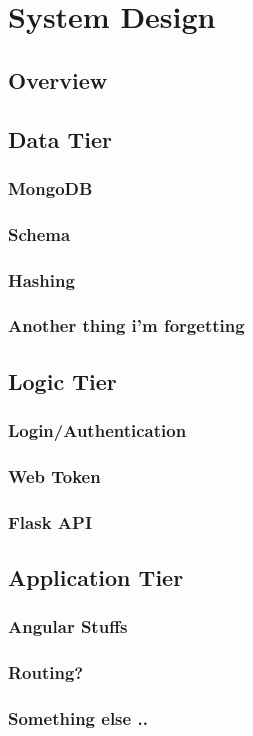 \chapter{System Design}

\section{Overview}

\section{Data Tier}
\subsection{MongoDB}
\subsection{Schema}
\subsection{Hashing}
\subsection{Another thing i'm forgetting}

\section{Logic Tier}
\subsection{Login/Authentication}
\subsection{Web Token}
\subsection{Flask API}

\section{Application Tier}
\subsection{Angular Stuffs}
\subsection{Routing?}
\subsection{Something else ..}